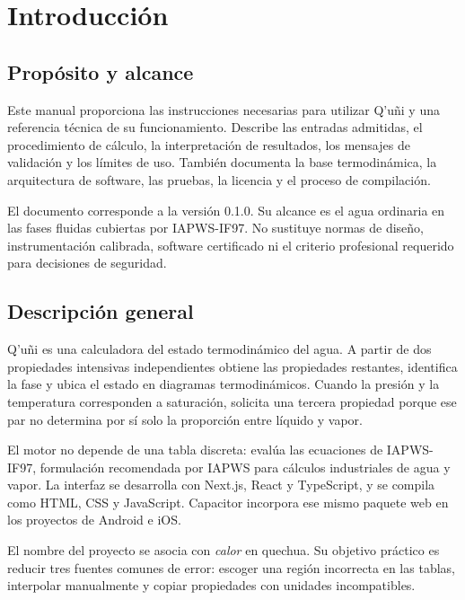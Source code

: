 \documentclass[11pt,a4paper,oneside]{article}
\newcommand{\app}{Q'u\~ni}
\begin{document}
\tableofcontents
\clearpage
{}

\section{Introducci\'on}

\subsection{Prop\'osito y alcance}

Este manual proporciona las instrucciones necesarias para utilizar \app{} y una referencia t\'ecnica de su funcionamiento. Describe las entradas admitidas, el procedimiento de c\'alculo, la interpretaci\'on de resultados, los mensajes de validaci\'on y los l\'imites de uso. Tambi\'en documenta la base termodin\'amica, la arquitectura de software, las pruebas, la licencia y el proceso de compilaci\'on.

El documento corresponde a la versi\'on 0.1.0. Su alcance es el agua ordinaria en las fases fluidas cubiertas por IAPWS-IF97. No sustituye normas de dise\~no, instrumentaci\'on calibrada, software certificado ni el criterio profesional requerido para decisiones de seguridad.

\subsection{Descripci\'on general}

\app{} es una calculadora del estado termodin\'amico del agua. A partir de dos propiedades intensivas independientes obtiene las propiedades restantes, identifica la fase y ubica el estado en diagramas termodin\'amicos. Cuando la presi\'on y la temperatura corresponden a saturaci\'on, solicita una tercera propiedad porque ese par no determina por s\'i solo la proporci\'on entre l\'iquido y vapor.

El motor no depende de una tabla discreta: eval\'ua las ecuaciones de IAPWS-IF97, formulaci\'on recomendada por IAPWS para c\'alculos industriales de agua y vapor. La interfaz se desarrolla con Next.js, React y TypeScript, y se compila como HTML, CSS y JavaScript. Capacitor incorpora ese mismo paquete web en los proyectos de Android e iOS.

El nombre del proyecto se asocia con \emph{calor} en quechua. Su objetivo pr\'actico es reducir tres fuentes comunes de error: escoger una regi\'on incorrecta en las tablas, interpolar manualmente y copiar propiedades con unidades incompatibles.
\end{document}
